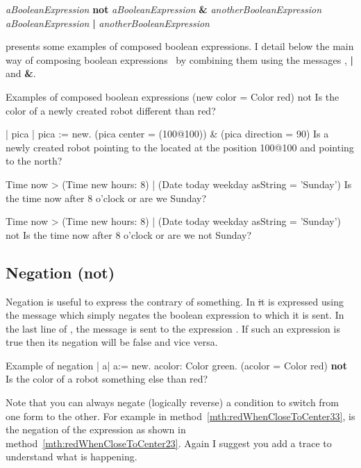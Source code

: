 \begin{nalltt}
\textit{aBooleanExpression} \textbf{not}
\textit{aBooleanExpression} \textbf{\&} \textit{anotherBooleanExpression}
\textit{aBooleanExpression} \textbf{|} \textit{anotherBooleanExpression}
\end{nalltt}

 presents some examples of composed boolean expressions. I detail below the main way of composing boolean expressions \ie\ by  combining them using the messages , \textbf{|} and \textbf{\&}. 


\begin{scriptwithtitle}{Examples of composed boolean expressions}\label{scr:compbool} 
(\Turtle new color = Color red) not
\textrm{Is the color of a newly created robot different than red?}

| pica |
pica := \Turtle new.
(pica center = (100@100)) & (pica direction = 90)
\textrm{Is a newly created robot pointing to the located at the position 100@100 and pointing to the north?}

Time now > (Time new hours: 8) |  (Date today  weekday asString = 'Sunday')
\textrm{Is the time now after 8 o'clock or are we Sunday?}

Time now > (Time new hours: 8) |  (Date today  weekday asString = 'Sunday') not
\textrm{Is the time now after 8 o'clock or are we not Sunday?}
\end{scriptwithtitle}

\subsection*{Negation (not)}

Negation is useful to express the contrary of something. In \st it is expressed using the message  which simply negates the boolean expression to which it is sent. 
In the last line of , the message  is sent to the expression . If such an expression is true then its negation will be false and vice versa.

\begin{scriptwithtitle}{Example of negation}\label{scr:negation}
| a\Turtle |
a\Turtle := \Turtle new.
a\Turtle color: Color green.
(a\Turtle  color = Color red) \textbf{not}
\textrm{Is the color of a robot something else than red?}
\end{scriptwithtitle}


Note that you can always negate (logically reverse) a condition to switch from one form to the other. For example in method~\ref{mth:redWhenCloseToCenter33},  is the negation of the expression  as shown in method~\ref{mth:redWhenCloseToCenter23}. Again I suggest you add a trace to understand what is happening.

